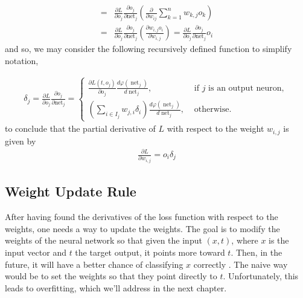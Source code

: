 \documentclass{article}
\DeclareMathOperator{\net}{net}
\begin{document}
\begin{enumerate}
\begin{equation}
\begin{split}
    =& {\frac {\partial L}{\partial o_{j}}}{\frac {\partial o_{j}}{\partial {\text{net}}_{j}}} \left(\frac{\partial {}}{\partial {w_{ij}}} {\sum^{n}_{k=1} w_{k,j}o_k}\right) \\ 
    =&{\frac {\partial L}{\partial o_{j}}}{\frac {\partial o_{j}}{\partial {\text{net}}_{j}}} \left(\frac{\partial {w_{i,j} o_i}}{\partial {w_{i,j}}} \right)={\frac {\partial L}{\partial o_{j}}}{\frac {\partial o_{j}}{\partial {\text{net}}_{j}}} o_i
  \end{split}
\end{equation}
   and so, we may consider the following recursively defined function to simplify notation,

\begin{equation*}
  \begin{split}
    \delta_j = {\frac {\partial L}{\partial o_{j}}}{\frac {\partial o_{j}}{\partial {\text{net}}_{j}}}= 
    \begin{cases}
      \frac{\partial {L(t, o_j)}}{\partial {o_j}} \frac{d {\varphi (\net_j)}}{d {\net_j}}, &\text{ if } j \text{ is an output neuron, }\\
      \left( \sum^{}_{i\in I_j} w_{j,i} \delta_i\right) \frac{d {\varphi (\net_j)}}{d {\net_j}} {}, &\text{ otherwise.} 
    \end{cases}
  \end{split}
\end{equation*}
to conclude that the partial derivative of $L$ with respect to the weight $w_{i,j}$ is given by 
\begin{equation*}
  \begin{split}
    \frac{\partial {L}}{\partial {w_{i,j}}} = o_i \delta_j
  \end{split}
\end{equation*}
      \end{enumerate}
\subsection{Weight Update Rule}%
  \label{sub:Weight Update Rule}
  After having found the derivatives of the loss function with respect to the weights, one needs a way to update the weights. The goal is to modify the weights of the neural network so that given the input $(x,t)$, where $x$ is the input vector and $t$ the target output, it points more toward $t$. Then, in the future, it will have a better chance of classifying $x$ correctly \citep{Hagan_Martin}. The naive way would be to set the weights so that they point directly to $t$. Unfortunately, this leads to overfitting, which we'll address in the next chapter.
  
\end{document}
